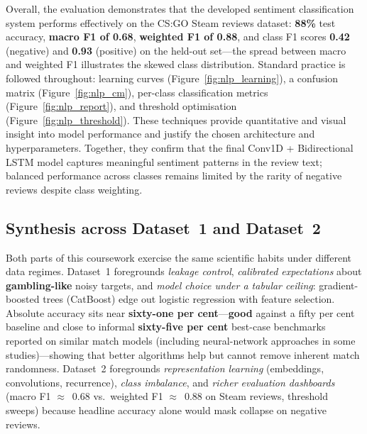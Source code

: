 \documentclass[12pt,a4paper]{article}
\begin{document}
Overall, the evaluation demonstrates that the developed sentiment classification system performs effectively on the CS:GO Steam reviews dataset: \textbf{88\%} test accuracy, \textbf{macro F1 of 0.68}, \textbf{weighted F1 of 0.88}, and class F1 scores \textbf{0.42} (negative) and \textbf{0.93} (positive) on the held-out set---the spread between macro and weighted F1 illustrates the skewed class distribution. Standard practice is followed throughout: learning curves (Figure~\ref{fig:nlp_learning}), a confusion matrix (Figure~\ref{fig:nlp_cm}), per-class classification metrics (Figure~\ref{fig:nlp_report}), and threshold optimisation (Figure~\ref{fig:nlp_threshold}). These techniques provide quantitative and visual insight into model performance and justify the chosen architecture and hyperparameters. Together, they confirm that the final Conv1D + Bidirectional LSTM model captures meaningful sentiment patterns in the review text; balanced performance across classes remains limited by the rarity of negative reviews despite class weighting.

\pagestyle{secBack}
\subsection*{Synthesis across Dataset~1 and Dataset~2}

Both parts of this coursework exercise the same scientific habits under different data regimes. Dataset~1 foregrounds \textit{leakage control}, \textit{calibrated expectations} about \textbf{gambling-like} noisy targets, and \textit{model choice under a tabular ceiling}: gradient-boosted trees (CatBoost) edge out logistic regression with feature selection. Absolute accuracy sits near \textbf{sixty-one per cent}---\textbf{good} against a fifty per cent baseline and close to informal \textbf{sixty-five per cent} best-case benchmarks reported on similar match models (including neural-network approaches in some studies)---showing that better algorithms help but cannot remove inherent match randomness. Dataset~2 foregrounds \textit{representation learning} (embeddings, convolutions, recurrence), \textit{class imbalance}, and \textit{richer evaluation dashboards} (macro F1 $\approx$~0.68 vs.\ weighted F1 $\approx$~0.88 on Steam reviews, threshold sweeps) because headline accuracy alone would mask collapse on negative reviews.
\end{document}
